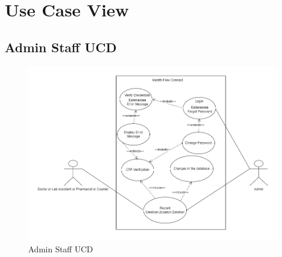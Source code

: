 \clearpage %

\section{Use Case View}
\subsection{Admin Staff UCD}
\begin{figure}[h!]
    \centering
    \includegraphics[width=1.1\textwidth]{Admin_Staff_UCD.png}
    \caption{Admin Staff UCD}
    \label{fig:admin_staff_ucd}
\end{figure}
\clearpage

